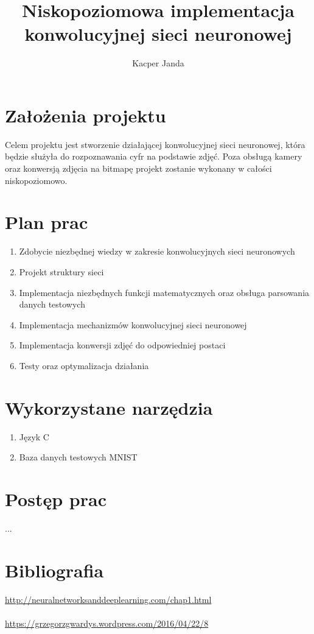 \documentclass[11pt, a4paper]{article}
\begin{document}
\title{Niskopoziomowa implementacja konwolucyjnej sieci neuronowej}
\author{Kacper Janda}
\date{}
\maketitle

\section{Założenia projektu}
Celem projektu jest stworzenie działającej konwolucyjnej sieci neuronowej, która będzie służyła do rozpoznawania cyfr na podstawie zdjęć. Poza obsługą kamery oraz konwersją zdjęcia na bitmapę projekt zostanie wykonany w całości niskopoziomowo.
\section{Plan prac}
\begin{enumerate}
\item Zdobycie niezbędnej wiedzy w zakresie konwolucyjnych sieci neuronowych
\item Projekt struktury sieci
\item Implementacja niezbędnych funkcji matematycznych oraz obsługa parsowania danych testowych
\item Implementacja mechanizmów konwolucyjnej sieci neuronowej
\item Implementacja konwersji zdjęć do odpowiedniej postaci
\item Testy oraz optymalizacja działania
\end{enumerate}
\section{Wykorzystane narzędzia}
\begin{enumerate}
\item Język C
\item Baza danych testowych MNIST
\end{enumerate}
\section{Postęp prac}
...
\section{Bibliografia}
\url{http://neuralnetworksanddeeplearning.com/chap1.html}\\\\
\url{https://grzegorzgwardys.wordpress.com/2016/04/22/8}\\\\
\end{document}
